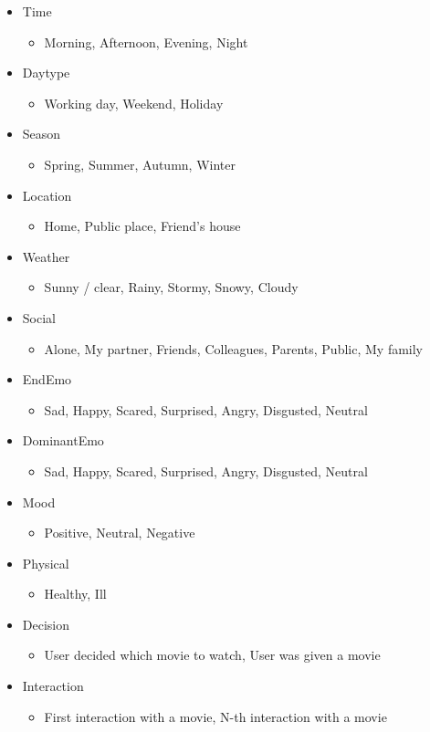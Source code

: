 \begin{itemize}
    \item Time
    \begin{itemize}
        \item Morning, Afternoon, Evening, Night
    \end{itemize}
    \item Daytype
    \begin{itemize}
        \item Working day, Weekend, Holiday
    \end{itemize}
    \item Season
    \begin{itemize}
        \item Spring, Summer, Autumn, Winter
    \end{itemize}
    \item Location
    \begin{itemize}
        \item Home, Public place, Friend's house
    \end{itemize}
    \item Weather
    \begin{itemize}
        \item Sunny / clear, Rainy, Stormy, Snowy, Cloudy
    \end{itemize}
    \item Social
    \begin{itemize}
        \item Alone, My partner, Friends, Colleagues, Parents, Public, My family
    \end{itemize}
    \item EndEmo
    \begin{itemize}
        \item Sad, Happy, Scared, Surprised, Angry, Disgusted, Neutral
    \end{itemize}
    \item DominantEmo
    \begin{itemize}
        \item Sad, Happy, Scared, Surprised, Angry, Disgusted, Neutral
    \end{itemize}
    \item Mood
    \begin{itemize}
        \item Positive, Neutral, Negative
    \end{itemize}
    \item Physical
    \begin{itemize}
        \item Healthy, Ill
    \end{itemize}
    \item Decision
    \begin{itemize}
        \item User decided which movie to watch, User was given a movie
    \end{itemize}
    \item Interaction
    \begin{itemize}
        \item First interaction with a movie, N-th interaction with a movie
    \end{itemize}
\end{itemize}

